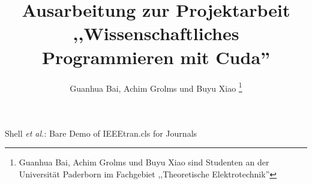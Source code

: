 \documentclass[journal]{IEEEtran}
\begin{document}
%
\title{Ausarbeitung zur Projektarbeit ,,Wissenschaftliches Programmieren mit Cuda''}
%
%
%

\author{Guanhua Bai,
        Achim Grolms und
        Buyu Xiao %
\thanks{Guanhua Bai, Achim Grolms und Buyu Xiao sind Studenten an der Universität Paderborn
im Fachgebiet ,,Theoretische Elektrotechnik''}%
}

%
%



%
{Shell \MakeLowercase{\textit{et al.}}: Bare Demo of IEEEtran.cls for Journals}
%
\end{document}
